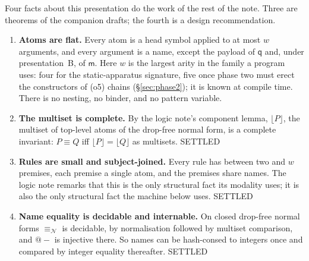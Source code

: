 \documentclass[11pt,a4paper]{article}
\makeatletter
\theoremstyle{plain}
\theoremstyle{definition}
\theoremstyle{remark}
\newcommand{\quo}[1]{@#1}
\newcommand{\nequiv}{\equiv_{\mathcal{N}}}
\newcommand{\scong}{\equiv}
\newcommand{\cmp}[1]{\lfloor #1 \rfloor}
\newcommand{\mm}{\mathsf{m}}
\newcommand{\qq}{\mathsf{q}}
\makeatother
\begin{document}
Four facts about this presentation do the work of the rest of the note. Three
are theorems of the companion drafts; the fourth is a design recommendation.

\begin{enumerate}[label=(F\arabic*),leftmargin=3em]
\item \textbf{Atoms are flat.} Every atom is a head symbol applied to at most
  $w$ arguments, and every argument is a name, except the payload of $\qq$
  and, under presentation~B, of $\mm$. Here $w$ is the largest arity in the
  family a program uses: four for the static-apparatus signature, five once
  phase two must erect the constructors of (o5) chains
  (\S\ref{sec:phase2}); it is known at compile time. There is no nesting, no binder, and no
  pattern variable.
\item \textbf{The multiset is complete.} By the logic note's component lemma,
  $\cmp{P}$, the multiset of top-level atoms of the drop-free normal form, is
  a complete invariant: $P \scong Q$ iff $\cmp{P} = \cmp{Q}$ as multisets.
  \textsf{SETTLED}
\item \textbf{Rules are small and subject-joined.} Every rule has between two
  and $w$ premises, each premise a single atom, and the premises share names.
  The logic note remarks that this is the only structural fact its modality
  uses; it is also the only structural fact the machine below uses.
  \textsf{SETTLED}
\item \textbf{Name equality is decidable and internable.} On closed drop-free
  normal forms $\nequiv$ is decidable, by normalisation followed by multiset
  comparison, and $\quo{-}$ is injective there. So names can be hash-consed to
  integers once and compared by integer equality thereafter. \textsf{SETTLED}
\end{enumerate}
\end{document}
